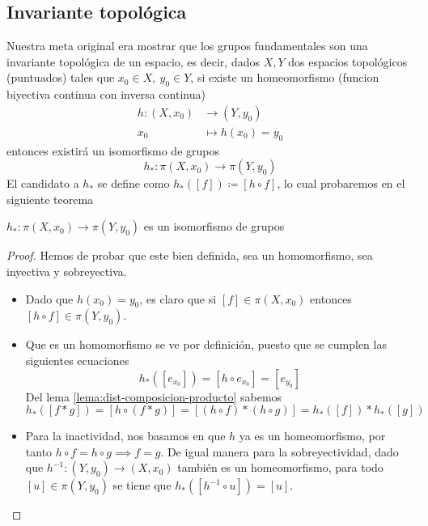 {\subsection{Invariante topológica}
Nuestra meta original era mostrar que los grupos fundamentales son una
invariante topológica de un espacio, es decir, dados \(X,Y\) dos
espacios topológicos (puntuados) tales que \(x_0 \in X,\ y_0 \in Y\), si
existe un homeomorfismo (funcion biyectiva continua con inversa continua)
\begin{align*}
  h : (X, x_0) &\to (Y, y_0) \\
  x_0 &\mapsto h(x_0) = y_0
\end{align*}
entonces existirá un isomorfismo de grupos
\[ h_{*} : \pi (X, x_0) \to \pi (Y, y_0) \]
El candidato a \(h_{*}\) se define como \(h_{*} ([f]) \coloneqq [h \circ
f] \), lo cual probaremos en el siguiente teorema
\begin{teorema} \label{thm:homoemorfismo-isomorfismo}
\(h_{*} : \pi (X, x_0) \to \pi (Y, y_0)\) es un isomorfismo de grupos
\end{teorema}
\begin{proof}
  Hemos de probar que este bien definida, sea un homomorfismo, sea
  inyectiva y sobreyectiva.
  \begin{itemize}
  \item Dado que \(h(x_0) = y_0\), es
    claro que si \([f] \in \pi (X, x_0) \) entonces \( [h \circ f] \in
    \pi (Y, y_0)\).

  \item Que es un homomorfismo se ve por definición, puesto que se cumplen
    las siguientes ecuaciones
    \[ h_{*} ([e_{x_0}]) = [h \circ e_{x_0}] = [e_{y_0}]\]
    Del lema \ref{lema:dist-composicion-producto} sabemos
    \[ h_{*} ([f * g]) = [h \circ (f * g)] = [(h \circ f) * (h \circ g)]
      = h_{*} ([f]) * h_{*} ([g])\]

  \item Para la inactividad, nos basamos en que \(h\) ya es un
    homeomorfismo, por tanto \( h \circ f = h \circ g \implies f = g \).
    De igual manera para la sobreyectividad, dado que \(h^{-1} : (Y,y_0)
    \to (X, x_0)\) también es un homeomorfismo, para todo \([u] \in \pi
    (Y, y_0) \) se tiene que \(h_{*} ([h^{-1} \circ u]) = [u]\).
  \end{itemize}
\end{proof}

}
